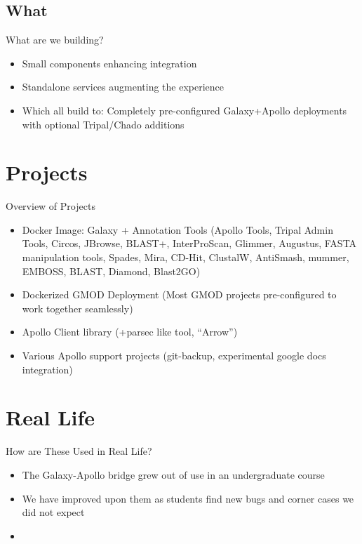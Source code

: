 \documentclass[12pt]{phage3slides} %
\begin{document}
\subsection{What}
\begin{frame}{What are we building?}
    \begin{itemize}
        \item Small components enhancing integration
        \item Standalone services augmenting the experience
        \item Which all build to: Completely pre-configured
            Galaxy+Apollo deployments with optional Tripal/Chado
            additions
    \end{itemize}
\end{frame}

\section{Projects}
\begin{frame}{Overview of Projects}
    \begin{itemize}
        \item Docker Image: Galaxy + Annotation Tools {\color{gray}(Apollo Tools, Tripal Admin Tools, Circos, JBrowse, BLAST+, InterProScan, Glimmer, Augustus, FASTA manipulation tools, Spades, Mira, CD-Hit, ClustalW, AntiSmash, mummer, EMBOSS, BLAST, Diamond, Blast2GO)}
        \item Dockerized GMOD Deployment {\color{gray}(Most GMOD projects pre-configured to work together seamlessly)}
        \item Apollo Client library {\color{gray}(+parsec like tool, ``Arrow'')}
        \item Various Apollo support projects {\color{gray}(git-backup, experimental google docs integration)}
    \end{itemize}
\end{frame}


\section{Real Life}
\begin{frame}{How are These Used in Real Life?}
    \begin{itemize}
        \item The Galaxy-Apollo bridge grew out of use in an undergraduate course
        \item We have improved upon them as students find new bugs and corner cases we did not expect
        \item 
    \end{itemize}
\end{frame}
\end{document}
